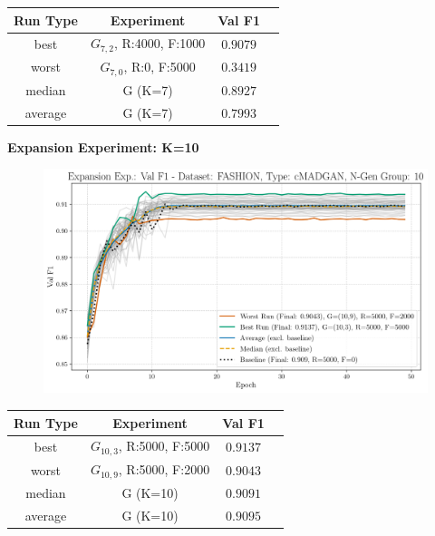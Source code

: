 \begin{table}[H]
	\vspace{-1em}
	\centering
	\begin{tabular}{|c|c|c|c|}
		\hline
		Run Type & Experiment & Val F1 \\ \hline
		best & \(G_{7, 2}\), R:4000, F:1000 & $0.9079$\\ \hline
		worst & \(G_{7, 0}\), R:0, F:5000 & $0.3419$\\ \hline
		median & G (K=7) & $0.8927$\\ \hline
		average & G (K=7) & $0.7993$
		\\ \hline
	\end{tabular}
\end{table}
\newpage
\noindent\textbf{Expansion Experiment: K=10}
\begin{figure}[htbp]
	\centering
	\includegraphics[width=.85\textwidth]{abb/strat_classifier_performance/FASHION_STRATIFIED_CLASSIFIERS_cMADGAN_NEW/expansion_experiments/val_f1_score_cMADGAN_FASHION_n_gen_10_all.png}
	\label{fig:app_strat_class_performance_expansion_exp._val_f1_score_10}
\end{figure}
\begin{table}[H]
	\vspace{-1em}
	\centering
	\begin{tabular}{|c|c|c|c|}
		\hline
		Run Type & Experiment & Val F1 \\ \hline
		best & \(G_{10, 3}\), R:5000, F:5000 & $0.9137$\\ \hline
		worst & \(G_{10, 9}\), R:5000, F:2000 & $0.9043$\\ \hline
		median & G (K=10) & $0.9091$\\ \hline
		average & G (K=10) & $0.9095$
		\\ \hline
	\end{tabular}
\end{table}
